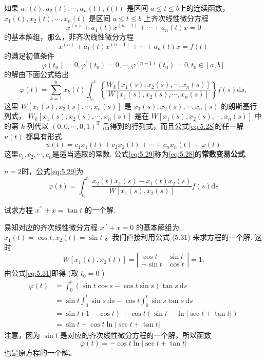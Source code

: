 如果 $a_1(t), a_2(t), \cdots, a_n(t), f(t)$ 是区间 $a \leqslant t \leqslant b$上的连续函数， $x_1(t), x_2(t), \cdots, x_n(t)$ 是区间 $a \leqslant t \leqslant b$ 上齐次线性微分方程
$$
    x^{(n)}+a_1(t) x^{(n-1)}+\cdots+a_n(t) x=0
$$
的基本解组，那么，非齐次线性微分方程
\begin{equation}\label{eq:5.28}
    x^{(n)}+a_1(t) x^{(n-1)}+\cdots+a_n(t) x=f(t)
\end{equation}
的满足初值条件
$$
    \varphi\left(t_0\right)=0, \varphi^{\prime}\left(t_0\right)=0, \cdots, \varphi^{(n-1)}\left(t_0\right)=0, t_0 \in[a, b]
$$
的解由下面公式给出
\begin{equation}\label{eq:5.29}
    \varphi(t)=\sum_{k=1}^n x_k(t) \int_{t_0}^t\left\{\frac{W_k\left[x_1(s), x_2(s), \cdots, x_n(s)\right]}{W\left[x_1(s), x_2(s), \cdots, x_n(s)\right]}\right\} f(s) \mathrm{d} s,
\end{equation}
这里 $W\left[x_1(s), x_2(s), \cdots, x_n(s)\right]$ 是 $x_1(s), x_2(s), \cdots, x_n(s)$ 的朗斯基行列式， $W_k\left[x_1(s), x_2(s), \cdots, x_n(s)\right]$ 是在 $W\left[x_1(s), x_2(s), \cdots, x_n(s)\right]$ 中的第 $k$ 列代以 $(0,0, \cdots, 0,1)^{\mathrm{T}}$ 后得到的行列式，而且公式\ref{eq:5.28}的任一解 $u(t)$ 都具有形式
$$
    u(t)=c_1 x_1(t)+c_2 x_2(t)+\cdots+c_n x_n(t)+\varphi(t)
$$
这里$c_1,c_2,\cdots,c_n$是适当选取的常数. 公式\ref{eq:5.29}称为\ref{eq:5.28}的\textbf{常数变易公式}.

$n=2$时，公式\ref{eq:5.29}为
\begin{equation}\label{eq:5.31}
    \varphi(t)=\int_{t_0}^t\frac{x_2(t)x_1(s)-x_1(t)x_2(s)}{W[x_1(s),x_2(s)]}f(s)\mathrm{d}s
\end{equation}
\begin{example}
    试求方程 $x^{\prime \prime}+x=\tan t$ 的一个解.
\end{example}
\begin{solution}
    易知对应的齐次线性微分方程 $x^{\prime \prime}+x=0$ 的基本解组为 $x_1(t)=\cos t, x_2(t)=\sin t$ 。我们直接利用公式 (5.31) 来求方程的一个解. 这时
    $$
        W\left[x_1(t), x_2(t)\right]=\left|\begin{array}{cc}
            \cos t  & \sin t \\
            -\sin t & \cos t
        \end{array}\right|=1 .
    $$
    由公式\ref{eq:5.31}即得 (取 $t_0=0$ )
    $$
        \begin{aligned}
            \varphi(t) & =\int_0^t(\sin t \cos s-\cos t \sin s) \tan s \mathrm{~d} s                       \\
                       & =\sin t \int_0^t \sin s \mathrm{~d} s-\cos t \int_0^t \sin s \tan s \mathrm{~d} s \\
                       & =\sin t(1-\cos t)+\cos t(\sin t-\ln |\sec t+\tan t|)                              \\
                       & =\sin t-\cos t \ln |\sec t+\tan t|
        \end{aligned}
    $$
    注意，因为 $\sin t$ 是对应的齐次线性微分方程的一个解，所以函数
    $$
        \bar{\varphi}(t)=-\cos t \ln |\sec t+\tan t|
    $$
    也是原方程的一个解。
\end{solution}

